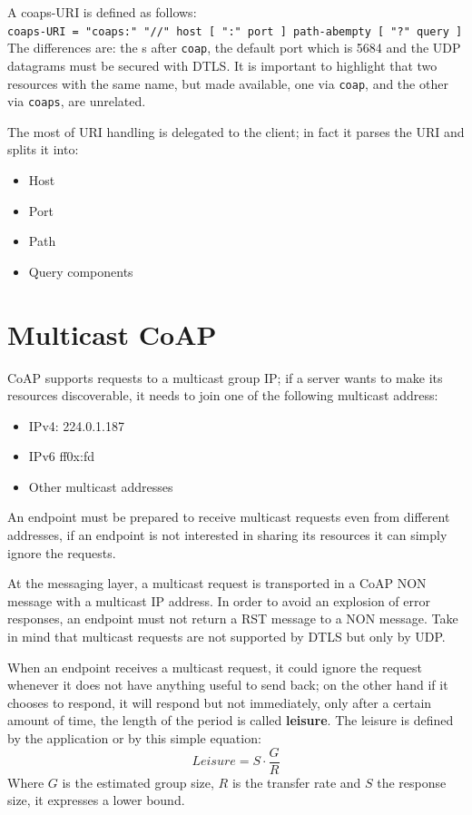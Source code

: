 	A coaps-URI is defined as follows:\\
	\texttt{coaps-URI = "coaps:" "//" host [ ":" port ] path-abempty [ "?" query ]}\\
	The differences are: the s after \texttt{coap}, the default port which is 5684 and the UDP datagrams must be secured with DTLS.
	It is important to highlight that two resources with the same name, but made available, one via \texttt{coap}, and the other via \texttt{coaps}, are unrelated.
	
	The most of URI handling is delegated to the client; in fact it parses the URI and splits it into:\newline
	\begin{itemize}
		\item Host
		\item Port
		\item Path
		\item Query components
	\end{itemize}
	
	\section{Multicast CoAP}
	CoAP supports requests to a multicast group IP; if a server wants to make its resources discoverable, it needs to join one of the following multicast address:
	\begin{itemize}
		\item IPv4: 224.0.1.187
		\item IPv6 ff0x:fd
		\item Other multicast addresses
	\end{itemize}

	An endpoint must be prepared to receive multicast requests even from different addresses, if an endpoint is not interested in sharing its resources it can simply ignore the requests.\newline
	
	At the messaging layer, a multicast request is transported in a CoAP NON message with a multicast IP address.\newline
	In order to avoid an explosion of error responses, an endpoint must not return a RST message to a NON message.\newline
	Take in mind that multicast requests are not supported by DTLS but only by UDP.\newline
	
	When an endpoint receives a multicast request, it could ignore the request whenever it does not have anything useful to send back; on the other hand if it chooses to respond, it will respond but not immediately, only after a certain amount of time, the length of the period is called \textbf{leisure}.\newline
	The leisure is defined by the application or by this simple equation:
	\begin{equation}Leisure=S\cdot\frac{G}{R}\end{equation}
	Where $G$ is the estimated group size, $R$ is the transfer rate and $S$ the response size, it expresses a lower bound.\newline
	
